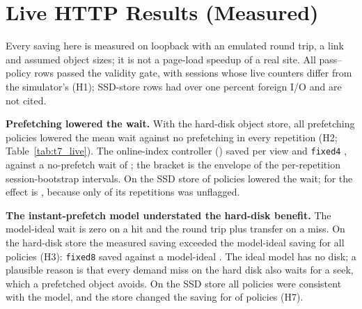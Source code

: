
\section{Live HTTP Results (Measured)}\label{sec:live}



Every saving here is measured on loopback with an emulated \liveRttMs{} round
trip, a \liveMbps{} link and assumed object sizes; it is not a page-load
speedup of a real site. All \liveRows{} pass--policy rows passed the validity
gate, with \liveParityMismatches{} sessions whose live counters differ from the
simulator's (H1); \liveFlaggedRows{} SSD-store rows had over one percent foreign
I/O and are not cited.

\textbf{Prefetching lowered the wait.} With the hard-disk object store, all
\decTallyHTwoHddLowersTheMeanWait{} prefetching policies lowered the mean wait
against no prefetching in every repetition (H2; Table~\ref{tab:t7_live}). The
online-index controller (\polOnline) saved
\liveSavedHddAdaptiveZeroPointOneAtTransOnlineCI{} per view and \texttt{fixed4}
\liveSavedHddFixedFourCI, against a no-prefetch wait of \liveBaseWaitHdd; the
bracket is the envelope of the per-repetition session-bootstrap intervals. On
the SSD store \decTallyHTwoSsdLowersTheMeanWait{} of \decTallyHTwoSsd{}
policies lowered the wait; for \polAdaptive{} the effect is
\decLiveHTwoSsdAdaptiveZeroPointZeroOneVerdict, because only
\liveRepsSsdAdaptiveZeroPointZeroOne{} of its \liveHeadlineReps{} repetitions was
unflagged.

\textbf{The instant-prefetch model understated the hard-disk benefit.} The
model-ideal wait is zero on a hit and the round trip plus transfer on a miss.
On the hard-disk store the measured saving exceeded the model-ideal saving for
all \decTallyHThreeHddTheInstantPrefetchModelUnderstatesTheBenefit{} policies
(H3): \texttt{fixed8} saved \liveSavedHddFixedEight{} against a model-ideal
\liveIdealSavedHddFixedEight. The ideal model has no disk; a plausible reason is that
every demand miss on the hard disk also waits for a seek, which a prefetched
object avoids. On
the SSD store all \decTallyHThreeSsdConsistentWithTheModel{} policies were
consistent with the model, and the store changed the saving for
\decTallyHSevenTheStoreChangesTheDelta{} of \decTallyHSeven{} policies (H7).

